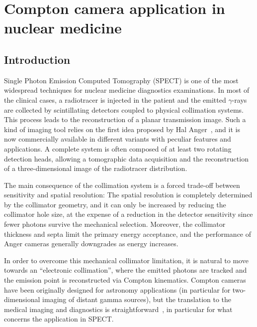 \chapter{Compton camera application in nuclear medicine}

\vfill

\minitoc

\newpage


\section{Introduction}\label{intro}
Single Photon Emission Computed Tomography (SPECT) is one of the most widespread techniques for nuclear medicine diagnostics examinations. In most of the clinical cases, a radiotracer is injected in the patient and the emitted $\gamma$-rays are collected by scintillating detectors coupled to physical collimation systems. This process leads to the reconstruction of a planar transmission image. Such a kind of imaging tool relies on the first idea proposed by Hal Anger~\parencite{Anger1958, Anger1964}, and it is now commercially available in different variants with peculiar features and applications. A complete system is often composed of at least two rotating detection heads, allowing a tomographic data acquisition and the reconstruction of a three-dimensional image of the radiotracer distribution.

The main consequence of the collimation system is a forced trade-off between sensitivity and spatial resolution: The spatial resolution is completely determined by the collimator geometry, and it can only be increased by reducing the collimator hole size, at the expense of a reduction in the detector sensitivity since fewer photons survive the mechanical selection. Moreover, the collimator thickness and septa limit the primary energy acceptance, and the performance of Anger cameras generally downgrades as energy increases. %

In order to overcome this mechanical collimator limitation, it is natural to move towards an \enquote{electronic collimation}, where the emitted photons are tracked and the emission point is reconstructed via Compton kinematics. Compton cameras have been originally designed for astronomy applications (in particular for two-dimensional imaging of distant gamma sources), but the translation to the medical imaging and diagnostics is straightforward~\cite{Everett, Singh_CC}, in particular for what concerns the application in SPECT.

